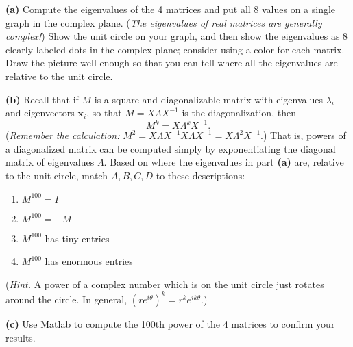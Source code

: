 \documentclass[12pt]{amsart}
\newcommand{\bx}{\bm{x}}
\newcommand{\epart}[1]{\medskip\noindent\textbf{(#1)}\quad }
\begin{document}
\epart{a}  Compute the eigenvalues of the 4 matrices and put all 8 values on a single graph in the complex plane.  (\emph{The eigenvalues of real matrices are generally complex!})  Show the unit circle on your graph, and then show the eigenvalues as 8 clearly-labeled dots in the complex plane; consider using a color for each matrix.  Draw the picture well enough so that you can tell where all the eigenvalues are relative to the unit circle.

\epart{b}  Recall that if $M$ is a square and diagonalizable matrix with eigenvalues $\lambda_i$ and eigenvectors $\bx_i$, so that $M=X \Lambda X^{-1}$ is the diagonalization, then
    $$M^{k} = X \Lambda^{k} X^{-1}.$$
(\emph{Remember the calculation:} $M^2 = X \Lambda X^{-1} X \Lambda X^{-1} = X \Lambda^2 X^{-1}$.)  That is, powers of a diagonalized matrix can be computed simply by exponentiating the diagonal matrix of eigenvalues $\Lambda$.  Based on where the eigenvalues in part \textbf{(a)} are, relative to the unit circle, match $A,B,C,D$ to these descriptions:
\renewcommand{\labelenumi}{\arabic{enumi}.}
\begin{enumerate}
\item $M^{100}=I$
\item $M^{100}=-M$
\item $M^{100}$ has tiny entries
\item $M^{100}$ has enormous entries
\end{enumerate}
(\emph{Hint.} A power of a complex number which is on the unit circle just rotates around the circle.  In general, $(r e^{i\theta})^k = r^k e^{ik\theta}$.)

\epart{c}  Use Matlab to compute the 100th power of the 4 matrices to confirm your results.
\end{document}

